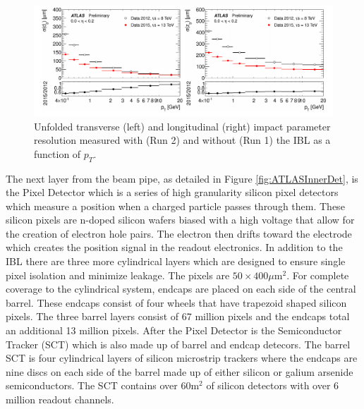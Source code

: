 \begin{figure}[h!]
	\centering
	\includegraphics[width=\columnwidth]{../ThesisImages/LHCImages/tracking.png}
	\caption[Unfolded transverse (left) and longitudinal (right) impact parameter resolutions measured with (Run 2) and without (Run 1) the IBL as a function of $p_T$.]{Unfolded transverse (left) and longitudinal (right) impact parameter resolution measured with (Run 2) and without (Run 1) the IBL as a function of $p_T$.\cite{Takubo:2017wvt}
	}
	\label{fig:impParamIBL}
\end{figure}

The next layer from the beam pipe, as detailed in Figure \ref{fig:ATLASInnerDet}, is the Pixel Detector which is a series of high granularity silicon pixel detectors which measure a position when a charged particle passes through them.  These silicon pixels are n-doped silicon wafers biased with a high voltage that allow for the creation of electron hole pairs.  The electron then drifts toward the electrode which creates the position signal in the readout electronics.  In addition to the IBL there are three more cylindrical layers which are designed to ensure single pixel isolation and minimize leakage.  The pixels are $50 \times 400\mu\text{m}^2$.  For complete coverage to the cylindrical system, endcaps are placed on each side of the central barrel.  These endcaps consist of four wheels that have trapezoid shaped silicon pixels.  The three barrel layers consist of 67 million pixels and the endcaps total an additional 13 million pixels.
After the Pixel Detector is the Semiconductor Tracker (SCT) which is also made up of barrel and endcap detecors.  The barrel SCT is four cylindrical layers of silicon microstrip trackers where the endcaps are nine discs on each side of the barrel made up of either silicon or galium arsenide semiconductors.  The SCT contains over $60\text{m}^2$ of silicon detectors with over 6 million readout channels.

